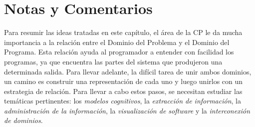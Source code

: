 

\pagebreak
\section{Notas y Comentarios}

Para resumir las ideas tratadas en este capítulo, el área de la CP le da mucha importancia a la relación entre el Dominio del Problema y el Dominio del Programa. Esta relación ayuda al programador a entender con facilidad los programas, ya que encuentra las partes del sistema que produjeron una determinada salida. Para llevar adelante, la difícil tarea de unir ambos dominios, un camino es construir una representación de cada uno y luego unirlos con un estrategia de relación. Para llevar a cabo estos pasos, se necesitan estudiar las temáticas pertinentes: los \textit{modelos cognitivos}, la \textit{extracción de información}, la \textit{administración de la información}, la \textit{visualización de software} y la \textit{interconexión de dominios}.




